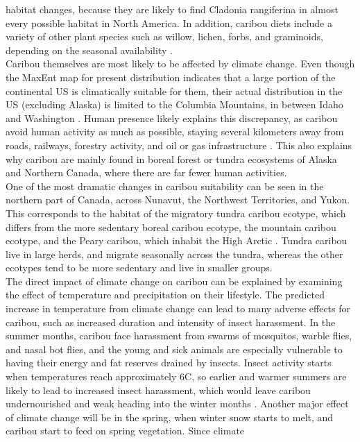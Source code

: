 \documentclass[twoside]{article}
\begin{document}
habitat changes, because they are likely to find Cladonia rangiferina in
almost every possible habitat in North America. In addition, caribou diets
include a variety of other plant species such as willow, lichen, forbs, and
graminoids, depending on the seasonal availability \cite{elenart}.\\
\indent Caribou themselves are most likely to be affected by climate change.
Even though the MaxEnt map for present distribution indicates that a large
portion of the continental US is climatically suitable for them, their actual
distribution in the US (excluding Alaska) is limited to the Columbia Mountains,
in between Idaho and Washington \cite{usfs2}. Human presence likely explains this
discrepancy, as caribou avoid human activity as much as possible, staying
several kilometers away from roads, railways, forestry activity, and oil or
gas infrastructure \cite{mfesta}. This also explains why caribou are
mainly found in boreal forest or tundra ecosystems of Alaska and Northern
Canada, where there are far fewer human activities. \\
\indent One of the most dramatic changes in caribou suitability can
be seen in the northern part of Canada, across Nunavut, the Northwest
Territories, and Yukon. This corresponds to the habitat of the migratory
tundra caribou ecotype, which differs from the more sedentary boreal caribou
ecotype, the mountain caribou ecotype, and the Peary caribou, which inhabit
the High Arctic \cite{mfesta}. Tundra caribou live in large herds,
and migrate seasonally across the tundra, whereas the other ecotypes tend
to be more sedentary and live in smaller groups. \\
\indent The direct impact of climate change on caribou can be explained by
examining the effect of temperature and precipitation on their lifestyle.
The predicted increase in temperature from climate change can lead to many
adverse effects for caribou, such as increased duration and intensity of
insect harassment. In the summer months, caribou face harassment from
swarms of mosquitos, warble flies, and nasal bot flies, and the young and
sick animals are especially vulnerable to having their energy and fat
reserves drained by insects. Insect activity starts when temperatures
reach approximately 6\degree C, so earlier and warmer summers are likely to lead
to increased insect harassment, which would leave caribou undernourished
and weak heading into the winter months \cite{jbrotton}. Another major
effect of climate change will be in the spring, when winter snow starts
to melt, and caribou start to feed on spring vegetation. Since climate
\end{document}
